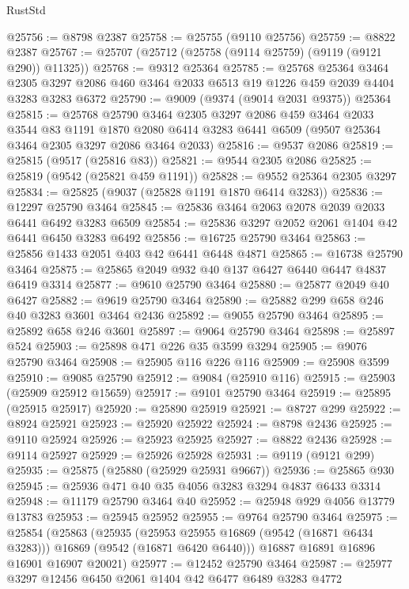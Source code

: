 \begin{lexlean}{RustStd}
\begin{coremodule}
@25756 := @8798 @2387
@25758 := @25755 (@9110 @25756)
@25759 := @8822 @2387
@25767 := @25707 (@25712 (@25758 (@9114 @25759) (@9119 (@9121 @290)) @11325))
@25768 := @9312 @25364
@25785 := @25768
    @25364
    @3464
    @2305
    @3297
    @2086
    @460
    @3464
    @2033
    @6513
    @19
    @1226
    @459
    @2039
    @4404
    @3283
    @3283
    @6372
@25790 := @9009 (@9374 (@9014 @2031 @9375)) @25364
@25815 := @25768
    @25790
    @3464
    @2305
    @3297
    @2086
    @459
    @3464
    @2033
    @3544
    @83
    @1191
    @1870
    @2080
    @6414
    @3283
    @6441
    @6509
    (@9507 @25364 @3464 @2305 @3297 @2086 @3464 @2033)
@25816 := @9537 @2086
@25819 := @25815 (@9517 (@25816 @83))
@25821 := @9544 @2305 @2086
@25825 := @25819 (@9542 (@25821 @459 @1191))
@25828 := @9552 @25364 @2305 @3297
@25834 := @25825 (@9037 (@25828 @1191 @1870 @6414 @3283))
@25836 := @12297 @25790 @3464
@25845 := @25836 @3464 @2063 @2078 @2039 @2033 @6441 @6492 @3283 @6509
@25854 := @25836 @3297 @2052 @2061 @1404 @42 @6441 @6450 @3283 @6492
@25856 := @16725 @25790 @3464
@25863 := @25856 @1433 @2051 @403 @42 @6441 @6448 @4871
@25865 := @16738 @25790 @3464
@25875 := @25865 @2049 @932 @40 @137 @6427 @6440 @6447 @4837 @6419 @3314
@25877 := @9610 @25790 @3464
@25880 := @25877 @2049 @40 @6427
@25882 := @9619 @25790 @3464
@25890 := @25882 @299 @658 @246 @40 @3283 @3601 @3464 @2436
@25892 := @9055 @25790 @3464
@25895 := @25892 @658 @246 @3601
@25897 := @9064 @25790 @3464
@25898 := @25897 @524
@25903 := @25898 @471 @226 @35 @3599 @3294
@25905 := @9076 @25790 @3464
@25908 := @25905 @116 @226 @116
@25909 := @25908 @3599
@25910 := @9085 @25790
@25912 := @9084 (@25910 @116)
@25915 := @25903 (@25909 @25912 @15659)
@25917 := @9101 @25790 @3464
@25919 := @25895 (@25915 @25917)
@25920 := @25890 @25919
@25921 := @8727 @299
@25922 := @8924 @25921
@25923 := @25920 @25922
@25924 := @8798 @2436
@25925 := @9110 @25924
@25926 := @25923 @25925
@25927 := @8822 @2436
@25928 := @9114 @25927
@25929 := @25926 @25928
@25931 := @9119 (@9121 @299)
@25935 := @25875 (@25880 (@25929 @25931 @9667))
@25936 := @25865 @930
@25945 := @25936 @471 @40 @35 @4056 @3283 @3294 @4837 @6433 @3314
@25948 := @11179 @25790 @3464 @40
@25952 := @25948 @929 @4056 @13779 @13783
@25953 := @25945 @25952
@25955 := @9764 @25790 @3464
@25975 := @25854
    (@25863
      (@25935
        (@25953 @25955 @16869 (@9542 (@16871 @6434 @3283)))
        @16869
        (@9542 (@16871 @6420 @6440)))
      @16887
      @16891
      @16896
      @16901
      @16907
      @20021)
@25977 := @12452 @25790 @3464
@25987 := @25977 @3297 @12456 @6450 @2061 @1404 @42 @6477 @6489 @3283 @4772

\end{coremodule}
\end{lexlean}
